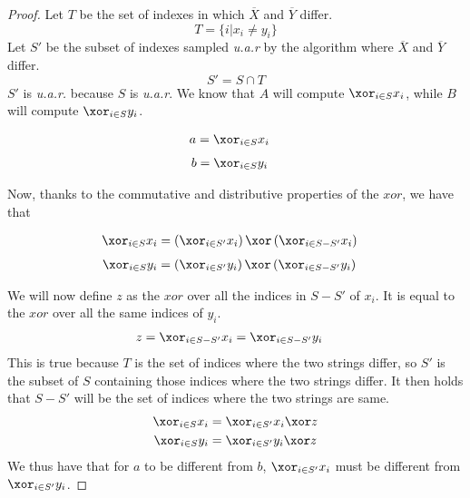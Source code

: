 \begin{proof}
    Let $T$ be the set of indexes in which $\overline{X}$ and $\overline{Y}$ differ.
    \[
        T = \{ i | x_i \neq y_i\} 
    \]
    Let $S'$ be the subset of indexes sampled \emph{u.a.r} by the algorithm where $\overline{X}$ and $\overline{Y}$ differ.
    \[
        S' = S \cap T 
    \]
    $S'$ is \emph{u.a.r.} because $S$ is \emph{u.a.r}. We know that $A$ will compute $\xor_{i \in S} x_i$, while $B$ will compute $\xor_{i \in S} y_i$.
    \begin{multicols}{2}
    \noindent
        \begin{align}
            a &= \xor_{i \in S} x_i
        \end{align}
        \begin{align}
            b &= \xor_{i \in S} y_i 
        \end{align}
    \end{multicols}
    Now, thanks to the commutative and distributive properties of the $xor$, we have that
    \begin{multicols}{2}   
    \noindent
        \begin{align}
            \xor_{i \in S} x_i &= \left( \xor_{i \in S'} x_i \right) \xor \left( \xor_{i \in S-S'} x_i \right)
        \end{align}
        \begin{align}
            \xor_{i \in S} y_i &= \left( \xor_{i \in S'} y_i \right) \xor \left( \xor_{i \in S-S'} y_i \right)
        \end{align}
    \end{multicols}
    We will now define $z$ as the $xor$ over all the indices in $S-S'$ of $x_i$. It is equal to the $xor$ over all the same indices of $y_i$.
    \begin{align}        
        z = \xor_{i \in S-S'} x_i &= \xor_{i \in S-S'} y_i
    \end{align}
    This is true because $T$ is the set of indices where the two strings differ, so $S'$ is the subset of $S$ containing those indices where the two strings differ. It then holds that $S-S'$ will be the set of indices where the two strings are same. 
    \begin{align}
        \xor_{i \in S} x_i &= \xor_{i \in S'} x_i \xor z \\
        \xor_{i \in S} y_i &= \xor_{i \in S'} y_i \xor z
    \end{align}
    We thus have that for $a$ to be different from $b$, $\xor_{i \in S'} x_i$ must be different from $\xor_{i \in S'} y_i $.

\end{proof}
